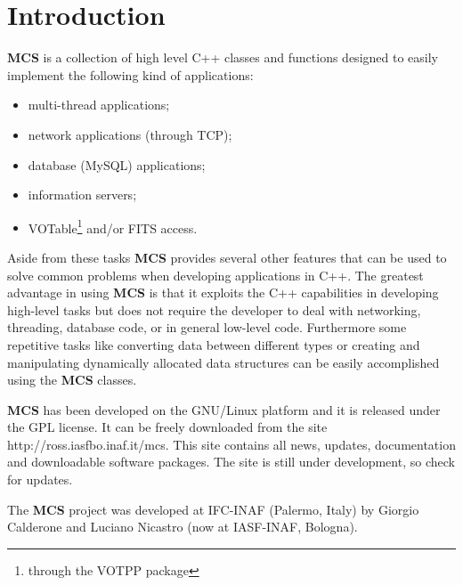 \documentclass[12pt,titlepage]{article}
\newcommand{\mcs}{\textbf{MCS} }
\def\url{http://ross.iasfbo.inaf.it/mcs}
\begin{document}
%
%
\newpage
\section{Introduction}

\mcs is a collection of high level C++ classes and functions designed
to easily implement the following kind of applications:

\begin{itemize}
\item multi-thread applications;
\item network applications (through TCP);
\item database (MySQL) applications;
\item information servers;
\item VOTable\footnote{through the VOTPP package} and/or FITS access.
\end{itemize}

Aside from these tasks \mcs provides several other features that can be
used to solve common problems when developing applications in C++. The
greatest advantage in using \mcs is that it exploits the C++ capabilities
in developing high-level tasks but does not require the developer to deal
with networking, threading, database code, or in general low-level code.
Furthermore some repetitive tasks like converting data between
different types or creating and manipulating dynamically allocated data
structures can be easily accomplished using the \mcs classes.

\bigskip
\mcs has been developed on the GNU/Linux platform and it is released under the
GPL license. It can be freely downloaded from the site \textsf{\url}. This
site contains all news, updates, documentation and downloadable software
packages. The site is still under development, so check for updates.

\bigskip
The \mcs project was developed at IFC-INAF (Palermo, Italy)
by Giorgio Calderone and Luciano Nicastro (now at IASF-INAF, Bologna).
\end{document}
